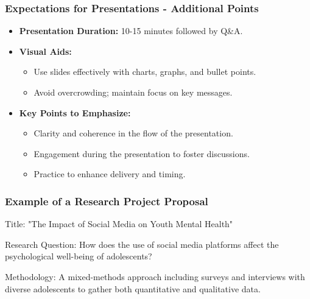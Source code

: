 \documentclass[aspectratio=169]{beamer}
\begin{document}
\begin{frame}[fragile]
    \frametitle{Expectations for Presentations - Additional Points}
    \begin{itemize}
        \item \textbf{Presentation Duration:} 10-15 minutes followed by Q\&A.
        \item \textbf{Visual Aids:}
            \begin{itemize}
                \item Use slides effectively with charts, graphs, and bullet points.
                \item Avoid overcrowding; maintain focus on key messages.
            \end{itemize}
        \item \textbf{Key Points to Emphasize:}
            \begin{itemize}
                \item Clarity and coherence in the flow of the presentation.
                \item Engagement during the presentation to foster discussions.
                \item Practice to enhance delivery and timing.
            \end{itemize}
    \end{itemize}
\end{frame}

\begin{frame}[fragile]
    \frametitle{Example of a Research Project Proposal}
    \begin{block}{Title:}
        "The Impact of Social Media on Youth Mental Health"
    \end{block}
    \begin{block}{Research Question:}
        How does the use of social media platforms affect the psychological well-being of adolescents?
    \end{block}
    \begin{block}{Methodology:}
        A mixed-methods approach including surveys and interviews with diverse adolescents to gather both quantitative and qualitative data.
    \end{block}
\end{frame}
\end{document}
